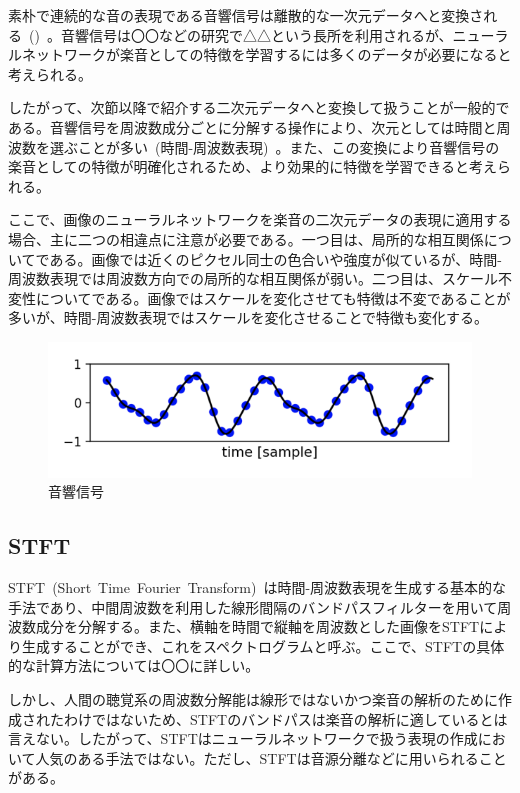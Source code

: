 素朴で連続的な音の表現である音響信号は離散的な一次元データへと変換される~()~。音響信号は〇〇などの研究で△△という長所を利用されるが、ニューラルネットワークが楽音としての特徴を学習するには多くのデータが必要になると考えられる。

したがって、次節以降で紹介する二次元データへと変換して扱うことが一般的である。音響信号を周波数成分ごとに分解する操作により、次元としては時間と周波数を選ぶことが多い~(時間-周波数表現)~。また、この変換により音響信号の楽音としての特徴が明確化されるため、より効果的に特徴を学習できると考えられる。

ここで、画像のニューラルネットワークを楽音の二次元データの表現に適用する場合、主に二つの相違点に注意が必要である。一つ目は、局所的な相互関係についてである。画像では近くのピクセル同士の色合いや強度が似ているが、時間-周波数表現では周波数方向での局所的な相互関係が弱い。二つ目は、スケール不変性についてである。画像ではスケールを変化させても特徴は不変であることが多いが、時間-周波数表現ではスケールを変化させることで特徴も変化する。

\begin{figure}[b]
\centering
\includegraphics[width=0.8\columnwidth]{figure/audio_signal.png}
\caption{音響信号}
\label{fig:audio_signal}
\end{figure}

\clearpage

\subsection{STFT}

STFT~(Short~Time~Fourier~Transform)~は時間-周波数表現を生成する基本的な手法であり、中間周波数を利用した線形間隔のバンドパスフィルターを用いて周波数成分を分解する。また、横軸を時間で縦軸を周波数とした画像をSTFTにより生成することができ、これをスペクトログラムと呼ぶ。ここで、STFTの具体的な計算方法については〇〇に詳しい。%

しかし、人間の聴覚系の周波数分解能は線形ではないかつ楽音の解析のために作成されたわけではないため、STFTのバンドパスは楽音の解析に適しているとは言えない。したがって、STFTはニューラルネットワークで扱う表現の作成において人気のある手法ではない。ただし、STFTは音源分離などに用いられることがある。%

